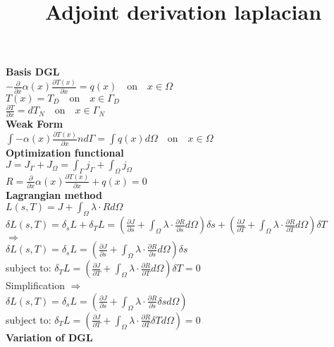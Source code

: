 \documentclass[10pt]{article} %
\title{Adjoint derivation laplacian}
\date{}
\begin{document}
\maketitle
\begin{center}
	\textbf{Basis DGL}\\
	$-\frac{\partial}{\partial x}\alpha(x) \frac{\partial T(x)}{\partial x} = q(x) \quad \text{on} \quad x\in\Omega$\\
	$T(x) = T_D \quad \text{on} \quad x\in\Gamma_D$\\
	$\frac{\partial T}{\partial x} = dT_N \quad \text{on} \quad x\in\Gamma_N$\\
	\textbf{Weak Form}\\
	$\int - \alpha(x) \frac{\partial T(x)}{\partial x} n d \Gamma = \int q(x) d\Omega \quad \text{on} \quad x\in\Omega$\\
	\textbf{Optimization functional}\\
	$J = J_\Gamma + J_\Omega = \int_\Gamma j_\Gamma + \int_\Omega j_\Omega$\\
	$R = \frac{\partial}{\partial x}\alpha(x) \frac{\partial T(x)}{\partial x} + q(x) = 0$\\
	\textbf{Lagrangian method}\\
	$L(s,T) = J + \int_\Omega \lambda \cdot R d\Omega$\\
	$\delta L(s,T) = \delta_s L + \delta_T L = \left( \frac{\partial J}{\partial s} + \int_\Omega \lambda \cdot \frac{\partial R}{\partial s}d\Omega\right) \delta s + \left( \frac{\partial J}{\partial T} + \int_\Omega \lambda \cdot \frac{\partial R}{\partial T}d\Omega\right) \delta T$\\
	$\Rightarrow$\\
	$\delta L(s,T) = \delta_s L = \left( \frac{\partial J}{\partial s} + \int_\Omega \lambda \cdot \frac{\partial R}{\partial s}d\Omega\right) \delta s $\\
	subject to: $ \delta_T L = \left( \frac{\partial J}{\partial T} + \int_\Omega \lambda \cdot \frac{\partial R}{\partial T}d\Omega\right) \delta T = 0$\\
	Simplification $\Rightarrow$\\
	$\delta L(s,T) = \delta_s L = \left( \frac{\partial J}{\partial s} + \int_\Omega \lambda \cdot \frac{\partial R}{\partial s}\delta s d\Omega\right)$\\
	subject to: $ \delta_T L = \left( \frac{\partial J}{\partial T} + \int_\Omega \lambda \cdot \frac{\partial R}{\partial T} \delta T d\Omega\right) = 0$\\
	\textbf{Variation of DGL}\\

\end{center}
\end{document}
